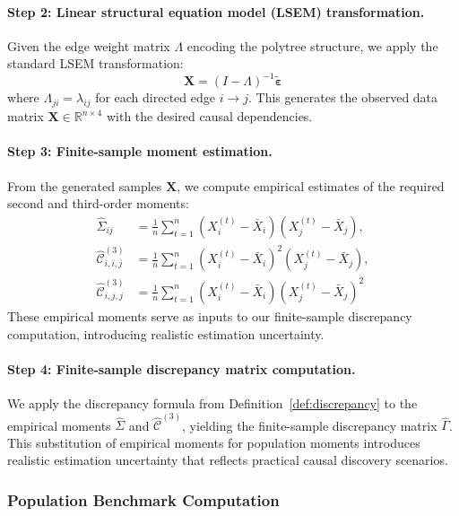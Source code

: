 \documentclass[11pt,a4paper]{article}
\numberwithin{equation}{section}
\begin{document}
\paragraph{Step 2: Linear structural equation model (LSEM) transformation.} Given the edge weight matrix $\Lambda$ encoding the polytree structure, we apply the standard LSEM transformation:
\begin{equation}
\mathbf{X} = (I - \Lambda)^{-1} \tilde{\boldsymbol{\varepsilon}}
\end{equation}
where $\Lambda_{ji} = \lambda_{ij}$ for each directed edge $i \to j$. This generates the observed data matrix $\mathbf{X} \in \mathbb{R}^{n \times 4}$ with the desired causal dependencies.

\paragraph{Step 3: Finite-sample moment estimation.} From the generated samples $\mathbf{X}$, we compute empirical estimates of the required second and third-order moments:
\begin{align}
\hat{\Sigma}_{ij} &= \frac{1}{n} \sum_{t=1}^n (X_i^{(t)} - \bar{X}_i)(X_j^{(t)} - \bar{X}_j), \\
\hat{\mathcal{C}}^{(3)}_{i,i,j} &= \frac{1}{n} \sum_{t=1}^n (X_i^{(t)} - \bar{X}_i)^2 (X_j^{(t)} - \bar{X}_j), \\
\hat{\mathcal{C}}^{(3)}_{i,j,j} &= \frac{1}{n} \sum_{t=1}^n (X_i^{(t)} - \bar{X}_i) (X_j^{(t)} - \bar{X}_j)^2
\end{align}
These empirical moments serve as inputs to our finite-sample discrepancy computation, introducing realistic estimation uncertainty.

\paragraph{Step 4: Finite-sample discrepancy matrix computation.} We apply the discrepancy formula from Definition~\ref{def:discrepancy} to the empirical moments $\hat{\Sigma}$ and $\hat{\mathcal{C}}^{(3)}$, yielding the finite-sample discrepancy matrix $\hat{\Gamma}$. This substitution of empirical moments for population moments introduces realistic estimation uncertainty that reflects practical causal discovery scenarios.

\subsubsection{Population Benchmark Computation}
\end{document}
